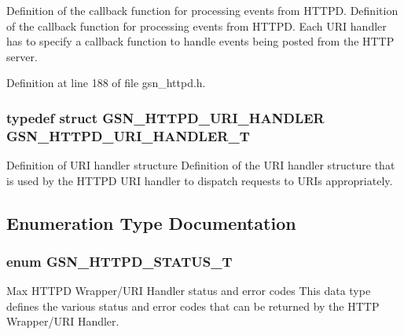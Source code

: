 Definition of the callback function for processing events from HTTPD. Definition of the callback function for processing events from HTTPD. Each URI handler has to specify a callback function to handle events being posted from the HTTP server. 



Definition at line 188 of file gsn\_\-httpd.h.

\hypertarget{a00666_ga3dd2e2bbc2820f5f49868effb95b371a}{
\subsubsection[{GSN\_\-HTTPD\_\-URI\_\-HANDLER\_\-T}]{\setlength{\rightskip}{0pt plus 5cm}typedef struct {\bf GSN\_\-HTTPD\_\-URI\_\-HANDLER}  {\bf GSN\_\-HTTPD\_\-URI\_\-HANDLER\_\-T}}}
\label{a00666_ga3dd2e2bbc2820f5f49868effb95b371a}


Definition of URI handler structure Definition of the URI handler structure that is used by the HTTPD URI handler to dispatch requests to URIs appropriately. 



\subsection{Enumeration Type Documentation}
\hypertarget{a00666_ga97ddf6ff1568f9984c83a2161cd9f49d}{
\subsubsection[{GSN\_\-HTTPD\_\-STATUS\_\-T}]{\setlength{\rightskip}{0pt plus 5cm}enum {\bf GSN\_\-HTTPD\_\-STATUS\_\-T}}}
\label{a00666_ga97ddf6ff1568f9984c83a2161cd9f49d}


Max HTTPD Wrapper/URI Handler status and error codes This data type defines the various status and error codes that can be returned by the HTTP Wrapper/URI Handler. 

